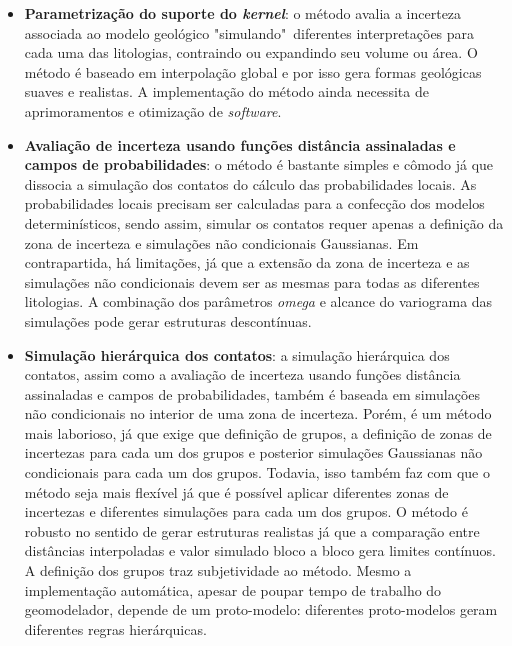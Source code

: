 \begin{itemize}
    \item \textbf{Parametrização do suporte do \textit{kernel}}: o método avalia a incerteza associada ao modelo geológico "simulando"\ diferentes interpretações para cada uma das litologias, contraindo ou expandindo seu volume ou área. O método é baseado em interpolação global e por isso gera formas geológicas suaves e realistas. A implementação do método ainda necessita de aprimoramentos e otimização de \textit{software}.
    \item \textbf{Avaliação de incerteza usando funções distância assinaladas e campos de probabilidades}: o método é bastante simples e cômodo já que dissocia a simulação dos contatos do cálculo das probabilidades locais. As probabilidades locais precisam ser calculadas para a confecção dos modelos determinísticos, sendo assim, simular os contatos requer apenas a definição da zona de incerteza e simulações não condicionais Gaussianas. Em contrapartida, há limitações, já que a extensão da zona de incerteza e as simulações não condicionais devem ser as mesmas para todas as diferentes litologias. A combinação dos parâmetros \textit{omega} e alcance do variograma das simulações pode gerar estruturas descontínuas. 
    \item \textbf{Simulação hierárquica dos contatos}: a simulação hierárquica dos contatos, assim como a avaliação de incerteza usando funções distância assinaladas e campos de probabilidades, também é baseada em simulações não condicionais no interior de uma zona de incerteza. Porém, é um método mais laborioso, já que exige que definição de grupos, a definição de zonas de incertezas para cada um dos grupos e posterior simulações Gaussianas não condicionais para cada um dos grupos. Todavia, isso também faz com que o método seja mais flexível já que é possível aplicar diferentes zonas de incertezas e diferentes simulações para cada um dos grupos. O método é robusto no sentido de gerar estruturas realistas já que a comparação entre distâncias interpoladas e valor simulado bloco a bloco gera limites contínuos. A definição dos grupos traz subjetividade ao método. Mesmo a implementação automática, apesar de poupar tempo de trabalho do geomodelador, depende de um proto-modelo: diferentes proto-modelos geram diferentes regras hierárquicas.

\end{itemize}
